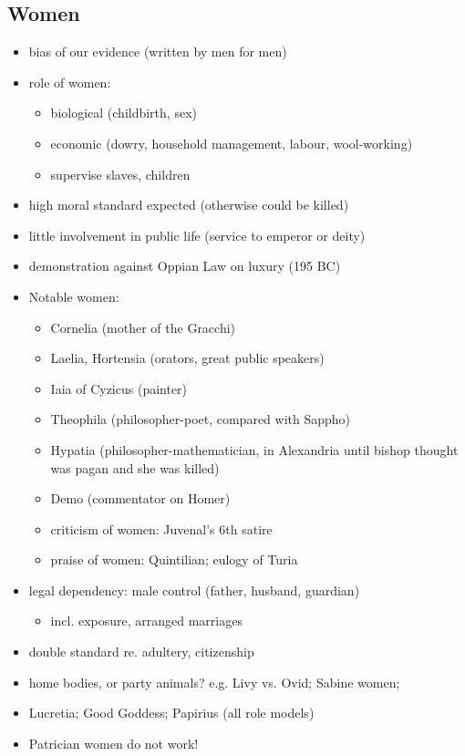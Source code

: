 \documentclass[12pt, twoside]{article}
\begin{document}
\subsection{Women}
\begin{itemize}
\item bias of our evidence (written by men for men)
\item role of women:
	\begin{itemize}	
	\item biological (childbirth, sex)
	\item economic (dowry, household management, labour, wool-working)
	\item supervise slaves, children
	\end{itemize}
\item high moral standard expected (otherwise could be killed)
\item little involvement in public life (service to emperor or deity)
\item demonstration against Oppian Law on luxury (195 BC)
\item Notable women:
	\begin{itemize}
	\item Cornelia (mother of the Gracchi)
	\item Laelia, Hortensia (orators, great public speakers)
	\item Iaia of Cyzicus (painter)
	\item Theophila (philosopher-poet, compared with Sappho)
	\item Hypatia (philosopher-mathematician, in Alexandria until bishop thought was pagan and she was killed)
	\item Demo (commentator on Homer)
	\item criticism of women: Juvenal's 6th satire
	\item praise of women: Quintilian; eulogy of Turia
	\end{itemize}
\item legal dependency: male control (father, husband, guardian)
	\begin{itemize}
	\item incl. exposure, arranged marriages
	\end{itemize}
\item double standard re. adultery, citizenship
\item home bodies, or party animals? e.g. Livy vs. Ovid; Sabine women;
\item Lucretia; Good Goddess; Papirius (all role models)
\item Patrician women do not work!

\end{itemize}
\end{document}
